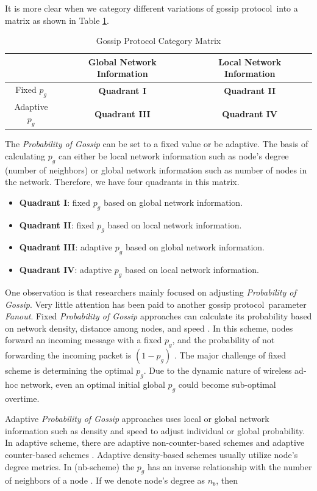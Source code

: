 \documentclass[onehalf,11pt]{beavtex}
\newcommand{\gp}{gossip protocol}
\newcommand{\pog}{Probability of Gossip}
\begin{document}
It is more clear when we category different variations of \gp ~into a matrix as shown in Table \ref{table:matrix}. 

\begin{table}[h]
	\centering
	\caption{Gossip Protocol Category Matrix}
	\label{table:matrix}
	\centering
	\begin{tabular}{|c|c|c|}
		\hline 
		& Global Network Information & Local Network Information \\ 
		\hline 
		Fixed  $p_g$ & \textbf{Quadrant I} & \textbf{Quadrant II} \\ 
		\hline 
		Adaptive $p_g$ & \textbf{Quadrant III} & \textbf{Quadrant IV} \\ 
		\hline 
	\end{tabular} 
\end{table}

The \emph{\pog} can be set to a fixed value or be adaptive. The basis of calculating $p_g$ can either be local network information such as node's degree (number of neighbors) or global network information such as number of nodes in the network. Therefore, we have four quadrants in this matrix. 

\begin{itemize}
	\item \textbf{Quadrant I}: fixed $p_g$ based on global network information. 
	\item \textbf{Quadrant II}: fixed $p_g$ based on local network information. 
	\item \textbf{Quadrant III}: adaptive $p_g$ based on global network information. 
	\item \textbf{Quadrant IV}: adaptive $p_g$ based on local network information. 
\end{itemize}

One observation is that researchers mainly focused on adjusting \emph{\pog}. Very little attention has been paid to another \gp ~parameter \emph{Fanout}. Fixed \emph{\pog} approaches can calculate its probability based on network density, distance among nodes, and speed \cite{2015survey}. In this scheme, nodes forward an incoming message with a fixed $p_g$, and the probability of not forwarding the incoming packet is $(1-p_g)$ \cite{2015survey}. The major challenge of fixed scheme is determining the optimal $p_g$. Due to the dynamic nature of wireless ad-hoc network, even an optimal initial global $p_g$ could become sub-optimal overtime. 

Adaptive \emph{\pog} approaches uses local or global network information such as density and speed to adjust individual or global probability. In adaptive scheme, there are adaptive non-counter-based schemes and adaptive counter-based schemes \cite{2015survey}. Adaptive density-based schemes usually utilize node's degree metrics. In (nb-scheme) the $p_g$ has an inverse relationship with the number of neighbors of a node \cite{cartigny2003border}. If we denote node's degree as $n_b$, then 
\end{document}
